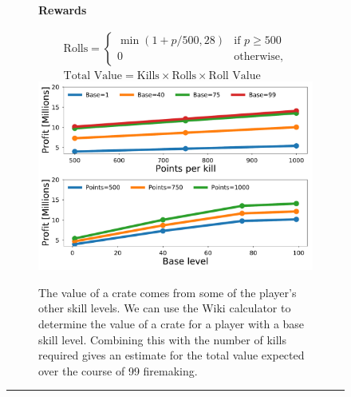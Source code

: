 \documentclass[]{article}
\newcommand{\lcol}{0.15}
\newcommand{\ccol}{0.55}
\newcommand{\rcol}{0.25}
\newcommand{\textsize}{\large}
\begin{document}
\begin{figure}[b]
		\begin{subfigure}{\lcol\linewidth}
		    \centering
		    \LARGE{\textbf{Rewards}}
		\end{subfigure}%
		\textsize
		\begin{subfigure}{\ccol\linewidth}
		    \vspace{5mm}
		    \centering
		    \begin{gather*}
			    \text{Rolls} = \begin{cases}
					\min(1 + p / 500, 28) & \text{if $p \ge 500$} \\
					0 & \text{otherwise},
				\end{cases}\\
				\text{Total Value} = \text{Kills} \times \text{Rolls} \times \text{Roll Value}
			\end{gather*}
		    \includegraphics[width=0.9\linewidth]{profit.pdf}
		    \vspace{5mm}
		\end{subfigure}%
		\begin{subfigure}{\rcol\linewidth}
		    The value of a crate comes from some of the player's other skill levels. We can use the Wiki calculator to determine the value of a crate for a player with a base skill level. Combining this with the number of kills required gives an estimate for the total value expected over the course of 99 firemaking.
		\end{subfigure}

		\hrule 


\end{figure}
\end{document}
